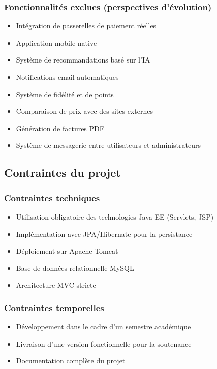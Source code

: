 \documentclass[12pt,a4paper]{report}
\begin{document}
\subsubsection{Fonctionnalités exclues (perspectives d'évolution)}

\begin{itemize}
    \item Intégration de passerelles de paiement réelles
    \item Application mobile native
    \item Système de recommandations basé sur l'IA
    \item Notifications email automatiques
    \item Système de fidélité et de points
    \item Comparaison de prix avec des sites externes
    \item Génération de factures PDF
    \item Système de messagerie entre utilisateurs et administrateurs
\end{itemize}

\subsection{Contraintes du projet}

\subsubsection{Contraintes techniques}

\begin{itemize}
    \item Utilisation obligatoire des technologies Java EE (Servlets, JSP)
    \item Implémentation avec JPA/Hibernate pour la persistance
    \item Déploiement sur Apache Tomcat
    \item Base de données relationnelle MySQL
    \item Architecture MVC stricte
\end{itemize}

\subsubsection{Contraintes temporelles}

\begin{itemize}
    \item Développement dans le cadre d'un semestre académique
    \item Livraison d'une version fonctionnelle pour la soutenance
    \item Documentation complète du projet
\end{itemize}
\end{document}
